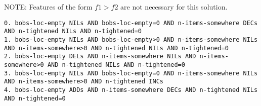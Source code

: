 \documentclass[a4paper]{article}
\begin{document}
NOTE: Features of the form $f1>f2$ are not necessary for this solution.

\begin{Verbatim}[fontsize=\footnotesize]
0. bobs-loc-empty NILs AND bobs-loc-empty=0 AND n-items-somewhere DECs AND n-tightened NILs AND n-tightened=0
1. bobs-loc-empty NILs AND bobs-loc-empty>0 AND n-items-somewhere NILs AND n-items-somewhere>0 AND n-tightened NILs AND n-tightened=0
2. bobs-loc-empty DELs AND n-items-somewhere NILs AND n-items-somewhere>0 AND n-tightened NILs AND n-tightened=0
3. bobs-loc-empty NILs AND bobs-loc-empty=0 AND n-items-somewhere NILs AND n-items-somewhere>0 AND n-tightened INCs
4. bobs-loc-empty ADDs AND n-items-somewhere DECs AND n-tightened NILs AND n-tightened=0
\end{Verbatim}




\end{document}
